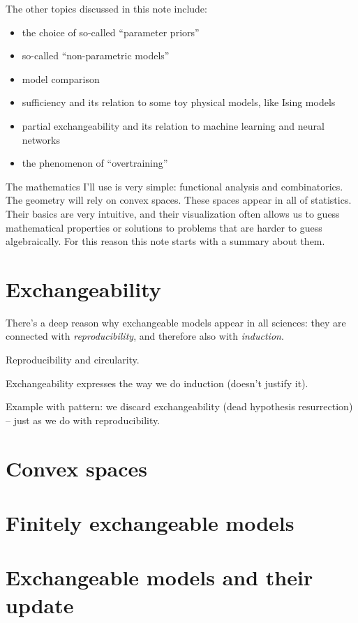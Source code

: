 \documentclass[\ifafour a4paper,12pt,\else a5paper,10pt,\fi%
onecolumn,oneside,article,%
british%
]{memoir}
\theoremstyle{remark}
\theoremstyle{innote}
\renewcommand*{\|}{\nonscript\,\vert\nonscript\;\mathopen{}}
\begin{document}
The other topics discussed in this note include:
\begin{itemize}
\item the choice of so-called \enquote{parameter priors}
\item so-called \enquote{non-parametric models}
\item model comparison
\item sufficiency and its relation to some toy physical models, like Ising
  models
\item partial exchangeability and its relation to machine learning and
  neural networks
\item the phenomenon of \enquote{overtraining}
\end{itemize}


The mathematics I'll use is very simple: functional analysis and
combinatorics. The geometry will rely on convex spaces. These spaces appear
in all of statistics. Their basics are very intuitive, and their
visualization often allows us to guess mathematical properties or solutions
to problems that are harder to guess algebraically. For this reason this
note starts with a summary about them.

\section{Exchangeability}
\label{sec:exchangeability}

There's a deep reason why exchangeable models appear in all sciences: they
are connected with \emph{reproducibility}, and therefore also with
\emph{induction}.

Reproducibility and circularity.

Exchangeability expresses the way we do induction (doesn't justify it).

Example with pattern: we discard exchangeability (dead hypothesis
resurrection) -- just as we do with reproducibility.

\section{Convex spaces}
\label{sec:convex_spaces}

\section{Finitely exchangeable models}
\label{sec:finitely_exchangeable}

\section{Exchangeable models and their update}
\label{sec:exchangeable_update}
\end{document}
